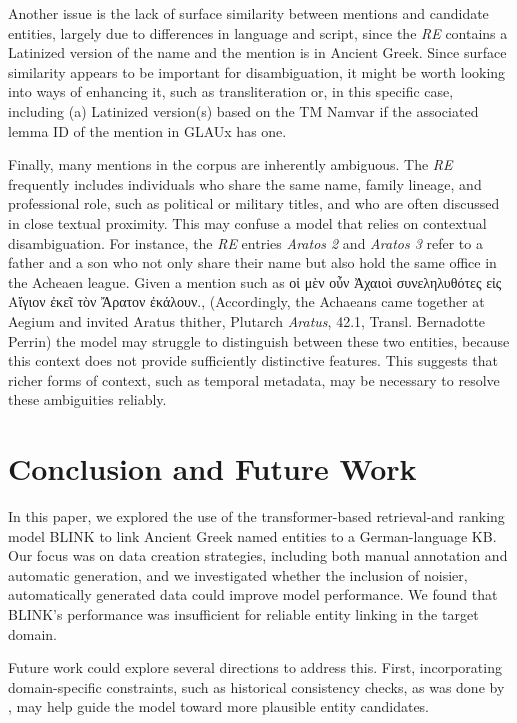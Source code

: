 \documentclass[final]{anthology-ch}
\begin{document}
Another issue is the lack of surface similarity between mentions and candidate entities, largely due to differences in language and script, since the \textit{RE} contains a Latinized version of the name and the mention is in Ancient Greek. Since surface similarity appears to be important for disambiguation, it might be worth looking into ways of enhancing it, such as transliteration or, in this specific case, including (a) Latinized version(s) based on the TM Namvar if the associated lemma ID of the mention in GLAUx has one.

Finally, many mentions in the corpus are inherently ambiguous. The \textit{RE} frequently includes individuals who share the same name, family lineage, and professional role, such as political or military titles, and who are often discussed in close textual proximity. This may confuse a model that relies on contextual disambiguation. For instance, the \textit{RE} entries \textit{Aratos 2} and \textit{Aratos 3} refer to a father and a son who not only share their name but also hold the same office in the Acheaen league. Given a mention such as
οἱ μὲν οὖν Ἀχαιοὶ συνεληλυθότες εἰς Αἴγιον ἐκεῖ τὸν Ἄρατον ἐκάλουν., (Accordingly, the Achaeans came together at Aegium and invited Aratus thither, Plutarch \textit{Aratus}, 42.1, Transl. Bernadotte Perrin) the model may struggle to distinguish between these two entities, because this context does not provide sufficiently distinctive features. This suggests that richer forms of context, such as temporal metadata, may be necessary to resolve these ambiguities reliably.

\section{Conclusion and Future Work} \label{sec:conclusion}

In this paper, we explored the use of the transformer-based retrieval-and ranking model BLINK to link Ancient Greek named entities to a German-language KB. Our focus was on data creation strategies, including both manual annotation and automatic generation, and we investigated whether the inclusion of noisier, automatically generated data could improve model performance. We found that BLINK's performance was insufficient for reliable entity linking in the target domain.

Future work could explore several directions to address this. First, incorporating domain-specific constraints, such as historical consistency checks, as was done by \textcite{graciotti_musical_2025}, may help guide the model toward more plausible entity candidates.
\end{document}
